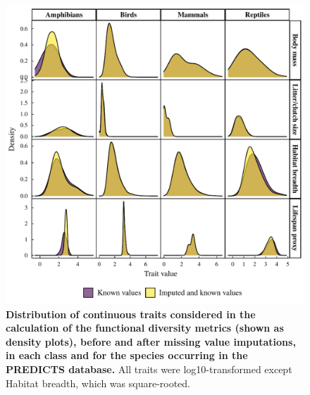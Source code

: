 \begin{figure}[h!]
\centering
\includegraphics[scale=0.8]{Supporting/Chapter3/Figures/SI_dist_cont}
\caption[Distribution of continuous traits considered in the calculation of the functional diversity metrics]{\textbf{Distribution of continuous traits considered in the calculation of the functional diversity metrics (shown as density plots), before and after missing value imputations, in each class and for the species occurring in the PREDICTS database.} All traits were log10-transformed except Habitat breadth, which was square-rooted.}
\label{SI3_F6}
\end{figure}

